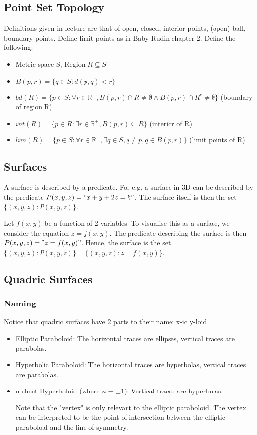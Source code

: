 \documentclass{article}
\begin{document}
\subsection{Point Set Topology}
Definitions given in lecture are that of open, closed, interior points, (open) ball, boundary points.
Define limit points as in Baby Rudin chapter 2.
Define the following:
\begin{itemize}
	\item Metric space S, Region $R\subseteq S$ 
	\item $B(p, r) = \{q\in S : d(p,q)<r\}$ 
	\item $bd(R) = \{p\in S : \forall r\in \mathbb{R}^+, B(p,r) \cap R\neq \emptyset \land B(p,r)\cap R^c\neq \emptyset \}$ (boundary of region R)
	\item $int(R) = \{p\in R : \exists r\in \mathbb{R}^+, B(p,r) \subseteq R\}$ (interior of R)
	\item $lim(R) = \{p\in S :  \forall r\in \mathbb{R}^+, \exists q\in S, q\neq p, q\in B(p,r)\}$ (limit points of R)
\end{itemize}

\subsection{Surfaces}
A surface is described by a predicate. For e.g. a surface in 3D can be described by the predicate $P(x,y,z)="x+y+2z=k"$. The surface itself is then the set $\{(x,y,z):P(x,y,z)\}$.

Let $f(x,y)$ be a function of 2 variables. To visualise this as a surface, we consider the equation $z=f(x,y)$. The predicate describing the surface is then $P(x,y,z)="z=f(x,y)"$. Hence, the surface is the set $\{(x,y,z):P(x,y,z)\}=\{(x,y,z):z=f(x,y)\}$.

\subsection{Quadric Surfaces}
\subsubsection{Naming}
Notice that quadric surfaces have 2 parts to their name: x-ic y-loid\\
\begin{itemize}
	\item Elliptic Paraboloid: The horizontal traces are ellipses, vertical traces are parabolas.
	\item Hyperbolic Paraboloid: The horizontal traces are hyperbolas, vertical traces are parabolas. 
	\item n-sheet Hyperboloid (where $n=\pm 1$): Vertical traces are hyperbolas.
	
Note that the "vertex" is only relevant to the elliptic paraboloid. The vertex can be interpreted to be the point of intersection between the elliptic paraboloid and the line of symmetry.
\end{itemize}
\end{document}
